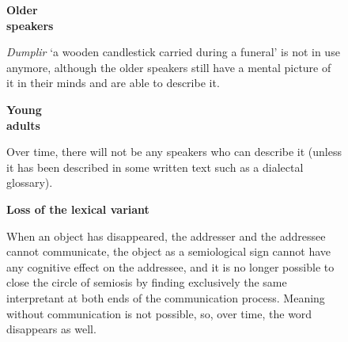   
	\begin{subfigure}[t]{0.29\textwidth}
		{\centering
		\vphantom{Loss of the lexical variant}\textbf{Older\\ speakers}\\[1em]
		}
		
		\emph{Dumplir} `a wooden candlestick carried during a funeral' is not in use anymore, although the older speakers still have a mental picture of it in their minds and are able to describe it.
	\end{subfigure}%
	\hspace{.05\textwidth}%
	\begin{subfigure}[t]{0.29\textwidth}
		{\centering
		\vphantom{Loss of the lexical variant}\textbf{Young\\ adults}\\[1em]
		}
		
		Over time, there will not be any speakers who can describe it (unless it has been described in some written text such as a dialectal glossary).
	\end{subfigure}%
	\hspace{.05\textwidth}%
	\begin{subfigure}[t]{0.29\textwidth}
		{\centering
		\vphantom{Loss of the lexical variant}\textbf{Loss of the lexical variant}\\[1em]
		}
		
		When an object has disappeared, the addresser and the addressee cannot communicate, the object as a semiological sign cannot have any cognitive effect on the addressee, and it is no longer possible to close the circle of semiosis by  finding exclusively the same interpretant at both ends of the communication process.
		Meaning without communication is not possible, so, over time, the word disappears as well.
	\end{subfigure}%